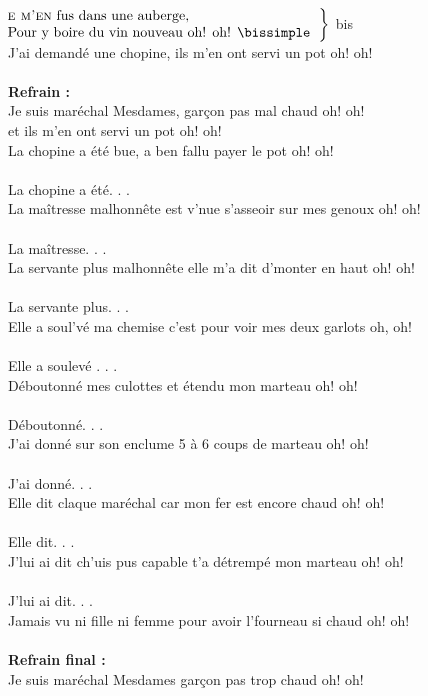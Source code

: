
~\\
$\left.\begin{tabular}{l}
\hspace{-0.4cm}
\textsc{e m'en} fus dans une auberge,
\\
\hspace{-0.4cm}
Pour y boire du vin nouveau oh! oh! \bissimple
\end{tabular}\right\rbrace$ bis
\\J'ai demandé une chopine, ils m'en ont servi un pot oh! oh!
\\\\\textbf{Refrain :}
\\Je suis maréchal Mesdames, garçon pas mal chaud oh! oh! \bissimple
\\
{et ils m'en ont servi un pot oh! oh!}
\\La chopine a été bue, a ben fallu payer le pot oh! oh!
\\\\La chopine a été. . . \bissimple
\\La maîtresse malhonnête est v'nue s'asseoir sur mes genoux oh! oh!
\\\\La maîtresse. . . \bissimple
\\La servante plus malhonnête elle m'a dit d'monter en haut oh! oh!
\\\\La servante plus. . . \bissimple
\\Elle a soul'vé ma chemise c'est pour voir mes deux garlots oh, oh!
\\\\Elle a soulevé . . . \bissimple
\\Déboutonné mes culottes et étendu mon marteau oh! oh!
\\\\Déboutonné. . . \bissimple
\\J'ai donné sur son enclume 5 à 6 coups de marteau oh! oh!
\\\\J'ai donné. . . \bissimple
\\Elle dit claque maréchal car mon fer est encore chaud oh! oh!
\\\\Elle dit. . . \bissimple
\\J'lui ai dit ch'uis pus capable t'a détrempé mon marteau oh! oh!
\\\\J'lui ai dit. . . \bissimple
\\Jamais vu ni fille ni femme pour avoir l'fourneau si chaud oh! oh!
\\\\\textbf{Refrain final :}
\\Je suis maréchal Mesdames garçon pas trop chaud oh! oh! \bissimple

\breakpage